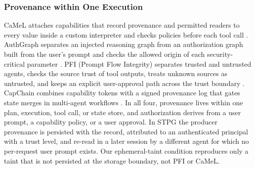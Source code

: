 \documentclass[applsci,article,submit,moreauthors]{Definitions/mdpi}
\begin{document}
\subsubsection{Provenance within One Execution}
CaMeL attaches capabilities that record provenance and permitted readers to every value inside a custom interpreter and checks policies before each tool call \cite{debenedetti2025camel}. AuthGraph separates an injected reasoning graph from an authorization graph built from the user's prompt and checks the allowed origin of each security-critical parameter \cite{wang2026authgraph}. PFI (Prompt Flow Integrity) separates trusted and untrusted agents, checks the source trust of tool outputs, treats unknown sources as untrusted, and keeps an explicit user-approval path across the trust boundary \cite{kim2025pfi}. CapChain combines capability tokens with a signed provenance log that gates state merges in multi-agent workflows \cite{capchain2026}. In all four, provenance lives within one plan, execution, tool call, or state store, and authorization derives from a user prompt, a capability policy, or a user approval. In STPG the producer provenance is persisted with the record, attributed to an authenticated principal with a trust level, and re-read in a later session by a different agent for which no per-request user prompt exists. Our ephemeral-taint condition reproduces only a taint that is not persisted at the storage boundary, not PFI or CaMeL.
\end{document}
